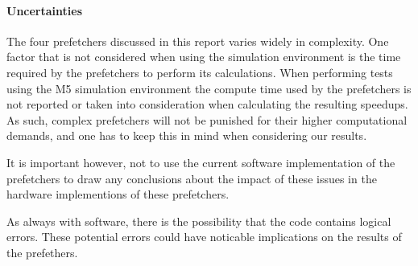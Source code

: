 \paragraph{Uncertainties}
\label{"waiting for reftex-label call..."}
The four prefetchers discussed in this report varies widely in complexity. One factor that is not considered when using the simulation environment is the time required by the prefetchers to perform its calculations. When performing tests using the M5 simulation environment the compute time used by the prefetchers is not reported or taken into consideration when calculating the resulting speedups. As such, complex prefetchers will not be punished for their higher computational demands, and one has to keep this in mind when considering our results. 

It is important however, not to use the current software implementation of the prefetchers to draw any conclusions about the impact of these issues in the hardware implementions of these prefetchers. 

As always with software, there is the possibility that the code contains logical errors. These potential errors could have noticable implications on the results of the prefethers.
